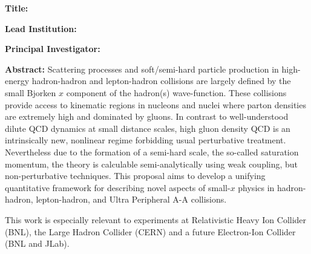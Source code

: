 %
\vspace{0.5em}
\noindent
{\bf Title:} \Title

\vspace{0.5em}
\noindent
{\bf Lead Institution:} \Institute

\vspace{0.5em}
\noindent
{\bf Principal Investigator:} \Investigator


\vspace{0.5em}
\noindent


\vspace{0.5em}
\noindent
{\bf Abstract:} 
Scattering processes and soft/semi-hard particle production in high-energy
hadron-hadron and lepton-hadron collisions are largely defined  by the 
small Bjorken $x$ component of the hadron(s) wave-function. 
These  collisions provide access to kinematic regions 
in nucleons and nuclei where parton densities are extremely high 
and dominated by gluons. In contrast to 
well-understood dilute QCD dynamics at small distance scales, 
high gluon density QCD is an intrinsically new, nonlinear regime
forbidding usual perturbative treatment. Nevertheless due to the formation of a semi-hard scale, 
the so-called saturation momentum, the theory is calculable  semi-analytically using 
weak coupling, but non-perturbative techniques.
This proposal aims to develop  a unifying quantitative framework for 
describing  novel aspects of small-$x$ physics in hadron-hadron,
lepton-hadron, and Ultra Peripheral A-A collisions.

This work is especially relevant to experiments at  Relativistic Heavy Ion Collider (BNL),
the Large Hadron Collider (CERN) and a future Electron-Ion Collider (BNL and JLab).  




